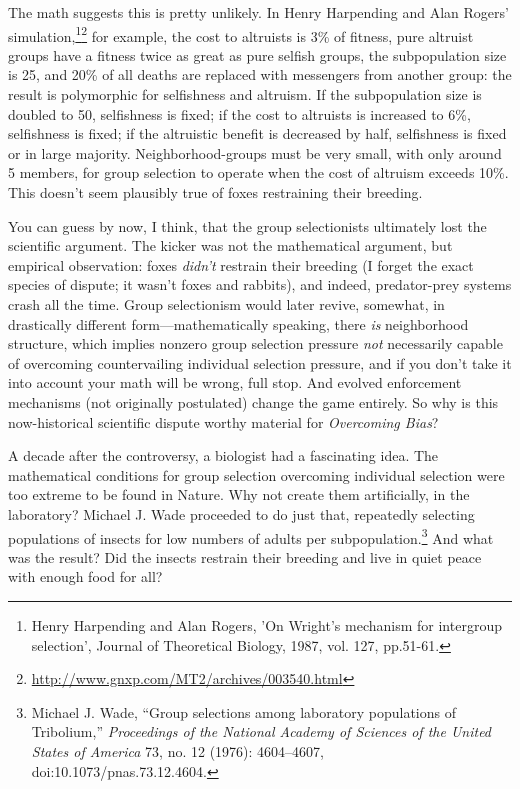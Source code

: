 {{
 The math suggests this is pretty unlikely. In Henry Harpending and Alan Rogers' simulation,\footnote{Henry Harpending and Alan Rogers, 'On Wright's mechanism for intergroup selection’, Journal of Theoretical Biology, 1987, vol. 127, pp.51-61.}\supercomma\footnote{\url{http://www.gnxp.com/MT2/archives/003540.html}} for
example, the cost to altruists is 3\% of fitness, pure altruist groups
have a fitness twice as great as pure selfish groups, the subpopulation
size is 25, and 20\% of all deaths are replaced with messengers from
another group: the result is polymorphic for selfishness and altruism.
If the subpopulation size is doubled to 50, selfishness is fixed; if
the cost to altruists is increased to 6\%, selfishness is fixed; if the
altruistic benefit is decreased by half, selfishness is fixed or in
large majority. Neighborhood-groups must be very small, with only
around 5 members, for group selection to operate when the cost of
altruism exceeds 10\%. This doesn't seem plausibly true
of foxes restraining their breeding.}

{
 You can guess by now, I think, that the group selectionists
ultimately lost the scientific argument. The kicker was not the
mathematical argument, but empirical observation: foxes
\textit{didn't} restrain their breeding (I forget the
exact species of dispute; it wasn't foxes and rabbits),
and indeed, predator-prey systems crash all the time. Group
selectionism would later revive, somewhat, in drastically different
form---mathematically speaking, there \textit{is} neighborhood
structure, which implies nonzero group selection pressure \textit{not}
necessarily capable of overcoming countervailing individual selection
pressure, and if you don't take it into account your
math will be wrong, full stop. And evolved enforcement mechanisms (not
originally postulated) change the game entirely. So why is this
now-historical scientific dispute worthy material for
\textit{Overcoming Bias}?}

{
 A decade after the controversy, a biologist had a fascinating
idea. The mathematical conditions for group selection overcoming
individual selection were too extreme to be found in Nature. Why not
create them artificially, in the laboratory? Michael J. Wade proceeded
to do just that, repeatedly selecting populations of insects for low
numbers of adults per subpopulation.\footnote{Michael J. Wade, ``Group selections among
laboratory populations of Tribolium,''
\textit{Proceedings of the National Academy of Sciences of the United
States of America} 73, no. 12 (1976): 4604--4607,
doi:10.1073/pnas.73.12.4604.} And what was
the result? Did the insects restrain their breeding and live in quiet
peace with enough food for all?}

}
